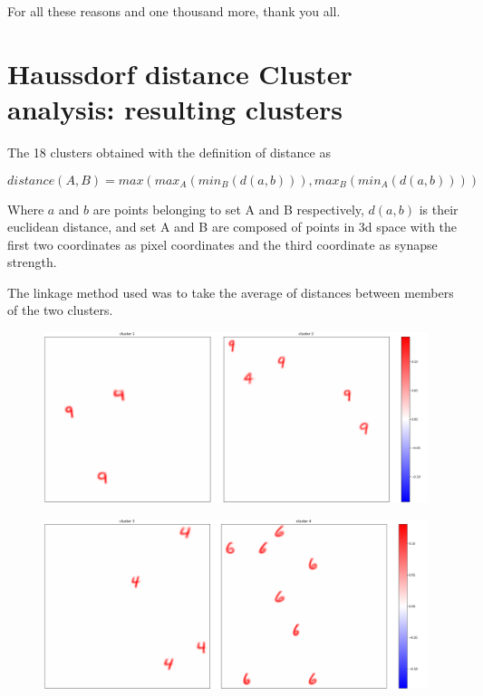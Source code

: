 \documentclass[a4paper]{report}
\begin{document}
For all these reasons and one thousand more, thank you all.



\appendix

\chapter{Haussdorf distance Cluster analysis: resulting clusters}

The 18 clusters obtained with the definition of distance as

\begin{equation}
    distance(A, B) = max(max_A(min_B(d(a,b))), max_B(min_A(d(a,b))))
\end{equation}

Where $a$ and $b$ are points belonging to set A and B respectively, $d(a,b)$ is their euclidean distance, and set A and B are composed of points in 3d space with the first two coordinates as pixel coordinates and the third coordinate as synapse strength.

The linkage method used was to take the average of distances between members of the two clusters.

\begin{figure} [H]
    \centering
    \includegraphics [width=\textwidth ] {c/h/1.png}
    \caption{}
\end{figure}

\begin{figure} [H]
    \centering
    \includegraphics [width=\textwidth ] {c/h/3.png}
    \caption{}
\end{figure}
\end{document}
